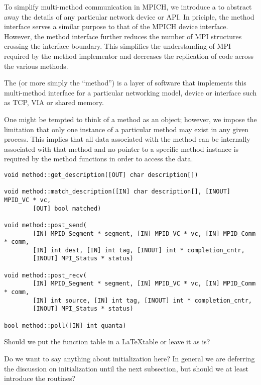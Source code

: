 To simplify multi-method communication in MPICH, we introduce a
 to abstract away the details of any particular
network device or API.  In priciple, the method interface serves a similar
purpose to that of the MPICH device interface.  However, the method interface
further reduces the number of MPI structures crossing the interface boundary.
This simplifies the understanding of MPI required by the method implementor and
decreases the replication of code across the various methods.

The  (or more simply the ``method'') is a layer of
software that implements this multi-method interface for a particular
networking model, device or interface such as TCP, VIA or shared memory.

\begin{discussion}
  One might be tempted to think of a method as an object; however, we impose
  the limitation that only one instance of a particular method may exist in any
  given process.  This implies that all data associated with the method can be
  internally associated with that method and no pointer to a specific method
  instance is required by the method functions in order to access the data.
\end{discussion}

\begin{verbatim}
void method::get_description([OUT] char description[])

void method::match_description([IN] char description[], [INOUT] MPID_VC * vc,
        [OUT] bool matched)

void method::post_send(
        [IN] MPID_Segment * segment, [IN] MPID_VC * vc, [IN] MPID_Comm * comm,
        [IN] int dest, [IN] int tag, [INOUT] int * completion_cntr,
        [INOUT] MPI_Status * status)

void method::post_recv(
        [IN] MPID_Segment * segment, [IN] MPID_VC * vc, [IN] MPID_Comm * comm,
        [IN] int source, [IN] int tag, [INOUT] int * completion_cntr,
        [INOUT] MPI_Status * status)

bool method::poll([IN] int quanta)
\end{verbatim}

\begin{cmt}[BRT]
Should we put the function table in a \LaTeX table or leave it as is?
\end{cmt}

\begin{cmt}[BRT]
  Do we want to say anything about initialization here?  In general we are
  deferring the discussion on initialization until the next subsection, but
  should we at least introduce the routines?
\end{cmt}

